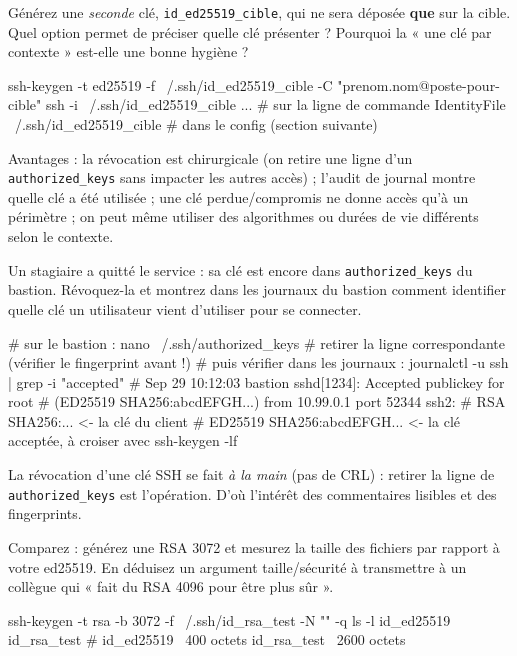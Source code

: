 \documentclass[a4paper,10pt]{exam}
\begin{document}
\begin{questions}
\begin{solution}
\end{solution}
\question Générez une \emph{seconde} clé, \texttt{id\_ed25519\_cible}, qui ne sera déposée
\textbf{que} sur la cible. Quel option permet de préciser quelle clé présenter ?
Pourquoi la « une clé par contexte » est-elle une bonne hygiène ?
\begin{solution}
\begin{bashcode}
ssh-keygen -t ed25519 -f ~/.ssh/id_ed25519_cible -C "prenom.nom@poste-pour-cible"
ssh -i ~/.ssh/id_ed25519_cible ...    # sur la ligne de commande
IdentityFile ~/.ssh/id_ed25519_cible  # dans le config (section suivante)
\end{bashcode}
Avantages : la révocation est chirurgicale (on retire une ligne d'un
\texttt{authorized\_keys} sans impacter les autres accès) ; l'audit de journal montre
quelle clé a été utilisée ; une clé perdue/compromis ne donne accès qu'à un périmètre ;
on peut même utiliser des algorithmes ou durées de vie différents selon le contexte.
\end{solution}
\question Un stagiaire a quitté le service : sa clé est encore dans
\texttt{authorized\_keys} du bastion. Révoquez-la et montrez dans les journaux du bastion
comment identifier quelle clé un utilisateur vient d'utiliser pour se connecter.
\begin{solution}
\begin{bashcode}
# sur le bastion :
nano ~/.ssh/authorized_keys     # retirer la ligne correspondante (vérifier le fingerprint avant !)
# puis vérifier dans les journaux :
journalctl -u ssh | grep -i "accepted"
# Sep 29 10:12:03 bastion sshd[1234]: Accepted publickey for root
#   (ED25519 SHA256:abcdEFGH...) from 10.99.0.1 port 52344 ssh2:
#   RSA SHA256:...             <- la clé du client
#   ED25519 SHA256:abcdEFGH... <- la clé acceptée, à croiser avec ssh-keygen -lf
\end{bashcode}
La révocation d'une clé SSH se fait \emph{à la main} (pas de CRL) : retirer la ligne de
\texttt{authorized\_keys} est l'opération. D'où l'intérêt des commentaires lisibles et
des fingerprints.
\end{solution}
\question Comparez : générez une RSA 3072 et mesurez la taille des fichiers par rapport à
votre ed25519. En déduisez un argument taille/sécurité à transmettre à un collègue
qui « fait du RSA 4096 pour être plus sûr ».
\begin{solution}
\begin{bashcode}
ssh-keygen -t rsa -b 3072 -f ~/.ssh/id_rsa_test -N "" -q
ls -l id_ed25519 id_rsa_test
# id_ed25519  ~400 octets   id_rsa_test ~2600 octets

\end{bashcode}
\end{solution}
\end{questions}
\end{document}
